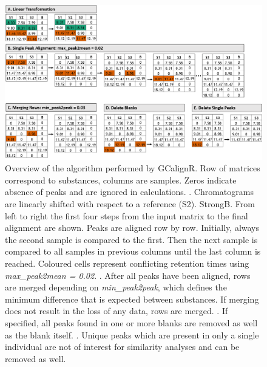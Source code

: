 \newpage
\begin{figure}[htbp]
  \centering
  \includegraphics[width=13cm]{figures/algorithm}
  \caption{Overview of the algorithm performed by GCalignR. Row of matrices correspond to substances, columns are samples. Zeros indicate absence of peaks and are ignored in calculations. . Chromatograms are linearly shifted with respect to a reference (S2). Strong{B}. From left to right the first four steps from the input matrix to the final alignment are shown. Peaks are aligned row by row. Initially, always the second sample is compared to the first. Then the next sample is compared to all samples in previous columns until the last column is reached. Coloured cells represent conflicting retention times using \textit{max{\_}peak2mean = 0.02}. . After all peaks have been aligned, rows are merged depending on \textit{min{\_}peak2peak}, which defines the minimum difference that is expected between substances. If merging does not result in the loss of any data, rows are merged. . If specified, all peaks found in one or more blanks are removed as well as the blank itself. . Unique peaks which are present in only a single individual are not of interest for similarity analyses and can be removed as well.}
  \label{figure:algorithm}
\end{figure} 

